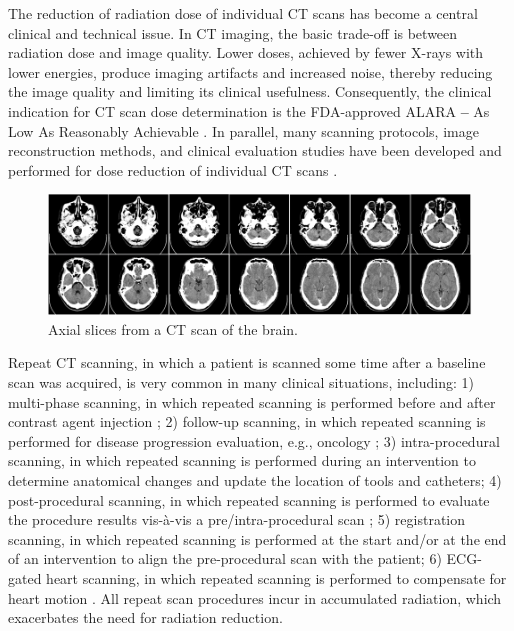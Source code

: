The reduction of radiation dose of individual CT scans has become a central clinical and technical issue. In CT imaging, the basic trade-off is between radiation dose and image quality. Lower doses, achieved by fewer X-rays with lower energies, produce imaging artifacts and increased noise, thereby reducing the image quality and limiting its clinical usefulness. Consequently, the clinical indication for CT scan dose determination is the FDA-approved ALARA \textbf{--} As Low As Reasonably Achievable \cite{newman2011alara}. In parallel, many scanning protocols, image reconstruction methods, and clinical evaluation studies have been developed and performed for dose reduction of individual CT scans \cite{shtok2013learned, moore2009adaptive}.

\begin{figure}[t]
    \centering
    \includegraphics[width=\textwidth]{figures/Brain_CT.png}
    \caption{\small{Axial slices from a CT scan of the brain.}}
    \label{fig:figures/Brain_CT.png}
\end{figure}

Repeat CT scanning, in which a patient is scanned some time after a baseline scan was acquired, is very common in many clinical situations, including: 1) multi-phase scanning, in which repeated scanning is performed before and after contrast agent injection \cite{kondo2007mdct}; 2) follow-up scanning, in which repeated scanning is performed for disease progression evaluation, e.g., oncology \cite{zhao2009evaluating}; 3) intra-procedural scanning, in which repeated scanning is performed during an intervention to determine anatomical changes and update the location of tools and catheters; 4) post-procedural scanning, in which repeated scanning is performed to evaluate the procedure results vis-à-vis a pre/intra-procedural scan \cite{thomas2010scheduled, hansen2006repeat}; 5) registration scanning, in which repeated scanning is performed at the start and/or at the end of an intervention to align the pre-procedural scan with the patient; 6) ECG-gated heart scanning, in which repeated scanning is performed to compensate for heart motion \cite{desjardins2004ecg, dafni2013methods}. All repeat scan procedures incur in accumulated radiation, which exacerbates the need for radiation reduction.

